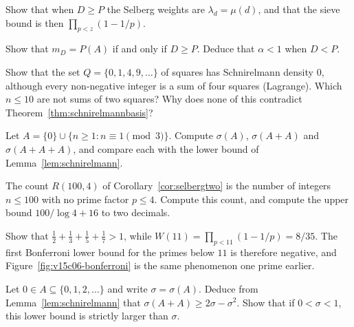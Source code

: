 \begin{exercise}[$\star$]\label{ex:muweights}
Show that when $D\ge P$ the Selberg weights are $\lambda_d=\mu(d)$, and that the sieve bound is then $\prod_{p<z}(1-1/p)$.
\end{exercise}

\begin{exercise}[$\star\star$]\label{ex:exact}
Show that $m_D=P(A)$ if and only if $D\ge P$. Deduce that $\alpha<1$ when $D<P$.
\end{exercise}

\begin{exercise}[$\star$]\label{ex:squaresdensity}
Show that the set $Q=\{0,1,4,9,\dots\}$ of squares has Schnirelmann density $0$, although every non-negative integer is a sum of four squares (Lagrange). Which $n\le10$ are not sums of two squares? Why does none of this contradict Theorem~\ref{thm:schnirelmannbasis}?
\end{exercise}

\begin{exercise}[$\star\star$]\label{ex:schnirelmannsharp}
Let $A=\{0\}\cup\{n\ge1:n\equiv1\pmod3\}$. Compute $\sigma(A)$, $\sigma(A+A)$ and $\sigma(A+A+A)$, and compare each with the lower bound of Lemma~\ref{lem:schnirelmann}.
\end{exercise}

\begin{exercise}[$\star$]\label{ex:v15-06-1}
The count \(R(100,4)\) of Corollary~\ref{cor:selbergtwo} is the number of integers \(n\le100\) with no prime factor \(p\le4\). Compute this count, and compute the upper bound \(100/\log4+16\) to two decimals.
\end{exercise}

\begin{exercise}[$\star$]\label{ex:v15-06-2}
Show that \(\tfrac12+\tfrac13+\tfrac15+\tfrac17>1\), while \(W(11)=\prod_{p<11}(1-1/p)=8/35\). The first Bonferroni lower bound for the primes below \(11\) is therefore negative, and Figure~\ref{fig:v15c06-bonferroni} is the same phenomenon one prime earlier.
\end{exercise}

\begin{exercise}[$\star\star$]\label{ex:v15-06-3}
Let \(0\in A\subseteq\{0,1,2,\dots\}\) and write \(\sigma=\sigma(A)\). Deduce from Lemma~\ref{lem:schnirelmann} that \(\sigma(A+A)\ge2\sigma-\sigma^2\). Show that if \(0<\sigma<1\), this lower bound is strictly larger than \(\sigma\).
\end{exercise}

